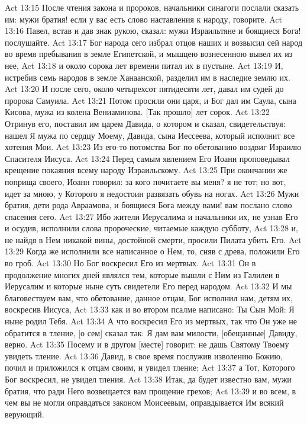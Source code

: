 Act 13:15  После чтения закона и пророков, начальники синагоги послали сказать им: мужи братия! если у вас есть слово наставления к народу, говорите.
Act 13:16  Павел, встав и дав знак рукою, сказал: мужи Израильтяне и боящиеся Бога! послушайте.
Act 13:17  Бог народа сего избрал отцов наших и возвысил сей народ во время пребывания в земле Египетской, и мышцею вознесенною вывел их из нее,
Act 13:18  и около сорока лет времени питал их в пустыне.
Act 13:19  И, истребив семь народов в земле Ханаанской, разделил им в наследие землю их.
Act 13:20  И после сего, около четырехсот пятидесяти лет, давал им судей до пророка Самуила.
Act 13:21  Потом просили они царя, и Бог дал им Саула, сына Кисова, мужа из колена Вениаминова. [Так прошло] лет сорок.
Act 13:22  Отринув его, поставил им царем Давида, о котором и сказал, свидетельствуя: нашел Я мужа по сердцу Моему, Давида, сына Иессеева, который исполнит все хотения Мои.
Act 13:23  Из его-то потомства Бог по обетованию воздвиг Израилю Спасителя Иисуса.
Act 13:24  Перед самым явлением Его Иоанн проповедывал крещение покаяния всему народу Израильскому.
Act 13:25  При окончании же поприща своего, Иоанн говорил: за кого почитаете вы меня? я не тот; но вот, идет за мною, у Которого я недостоин развязать обувь на ногах.
Act 13:26  Мужи братия, дети рода Авраамова, и боящиеся Бога между вами! вам послано слово спасения сего.
Act 13:27  Ибо жители Иерусалима и начальники их, не узнав Его и осудив, исполнили слова пророческие, читаемые каждую субботу,
Act 13:28  и, не найдя в Нем никакой вины, достойной смерти, просили Пилата убить Его.
Act 13:29  Когда же исполнили все написанное о Нем, то, сняв с древа, положили Его во гроб.
Act 13:30  Но Бог воскресил Его из мертвых.
Act 13:31  Он в продолжение многих дней являлся тем, которые вышли с Ним из Галилеи в Иерусалим и которые ныне суть свидетели Его перед народом.
Act 13:32  И мы благовествуем вам, что обетование, данное отцам, Бог исполнил нам, детям их, воскресив Иисуса,
Act 13:33  как и во втором псалме написано: Ты Сын Мой: Я ныне родил Тебя.
Act 13:34  А что воскресил Его из мертвых, так что Он уже не обратится в тление, [о сем] сказал так: Я дам вам милости, [обещанные] Давиду, верно.
Act 13:35  Посему и в другом [месте] говорит: не дашь Святому Твоему увидеть тление.
Act 13:36  Давид, в свое время послужив изволению Божию, почил и приложился к отцам своим, и увидел тление;
Act 13:37  а Тот, Которого Бог воскресил, не увидел тления.
Act 13:38  Итак, да будет известно вам, мужи братия, что ради Него возвещается вам прощение грехов;
Act 13:39  и во всем, в чем вы не могли оправдаться законом Моисеевым, оправдывается Им всякий верующий.
